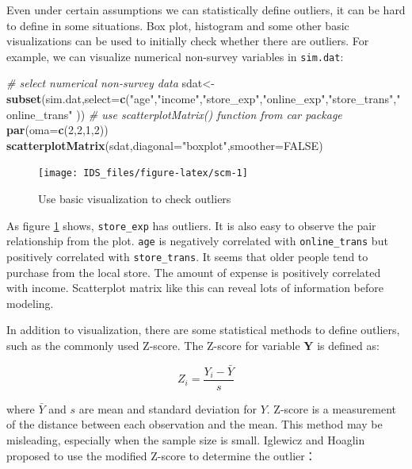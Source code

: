 \documentclass[12pt,]{krantz}
\newenvironment{Shaded}{\begin{snugshade}}{\end{snugshade}}
\newcommand{\KeywordTok}[1]{\textcolor[rgb]{0.13,0.29,0.53}{\textbf{#1}}}
\newcommand{\DataTypeTok}[1]{\textcolor[rgb]{0.13,0.29,0.53}{#1}}
\newcommand{\DecValTok}[1]{\textcolor[rgb]{0.00,0.00,0.81}{#1}}
\newcommand{\StringTok}[1]{\textcolor[rgb]{0.31,0.60,0.02}{#1}}
\newcommand{\CommentTok}[1]{\textcolor[rgb]{0.56,0.35,0.01}{\textit{#1}}}
\newcommand{\OtherTok}[1]{\textcolor[rgb]{0.56,0.35,0.01}{#1}}
\newcommand{\NormalTok}[1]{#1}
\theoremstyle{definition}
\theoremstyle{definition}
\theoremstyle{definition}
\theoremstyle{remark}
\begin{document}
Even under certain assumptions we can statistically define outliers, it
can be hard to define in some situations. Box plot, histogram and some
other basic visualizations can be used to initially check whether there
are outliers. For example, we can visualize numerical non-survey
variables in \texttt{sim.dat}:

\begin{Shaded}
\begin{Highlighting}[]
\CommentTok{# select numerical non-survey data}
\NormalTok{sdat<-}\KeywordTok{subset}\NormalTok{(sim.dat,}\DataTypeTok{select=}\KeywordTok{c}\NormalTok{(}\StringTok{"age"}\NormalTok{,}\StringTok{"income"}\NormalTok{,}\StringTok{"store_exp"}\NormalTok{,}\StringTok{"online_exp"}\NormalTok{,}\StringTok{"store_trans"}\NormalTok{,}\StringTok{"online_trans"}\NormalTok{ ))}
\CommentTok{# use scatterplotMatrix() function from car package}
\KeywordTok{par}\NormalTok{(}\DataTypeTok{oma=}\KeywordTok{c}\NormalTok{(}\DecValTok{2}\NormalTok{,}\DecValTok{2}\NormalTok{,}\DecValTok{1}\NormalTok{,}\DecValTok{2}\NormalTok{))}
\KeywordTok{scatterplotMatrix}\NormalTok{(sdat,}\DataTypeTok{diagonal=}\StringTok{"boxplot"}\NormalTok{,}\DataTypeTok{smoother=}\OtherTok{FALSE}\NormalTok{)}
\end{Highlighting}
\end{Shaded}

\begin{figure}

{\centering \texttt{[image: IDS\_files/figure-latex/scm-1]} 

}

\caption{Use basic visualization to check outliers}\label{fig:scm}
\end{figure}

As figure \ref{fig:scm} shows, \texttt{store\_exp} has outliers. It is
also easy to observe the pair relationship from the plot. \texttt{age}
is negatively correlated with \texttt{online\_trans} but positively
correlated with \texttt{store\_trans}. It seems that older people tend
to purchase from the local store. The amount of expense is positively
correlated with income. Scatterplot matrix like this can reveal lots of
information before modeling.

In addition to visualization, there are some statistical methods to
define outliers, such as the commonly used Z-score. The Z-score for
variable \(\mathbf{Y}\) is defined as:

\[Z_{i}=\frac{Y_{i}-\bar{Y}}{s}\]

where \(\bar{Y}\) and \(s\) are mean and standard deviation for \(Y\).
Z-score is a measurement of the distance between each observation and
the mean. This method may be misleading, especially when the sample size
is small. Iglewicz and Hoaglin proposed to use the modified Z-score to
determine the outlier\citep{mad1}：
\end{document}
